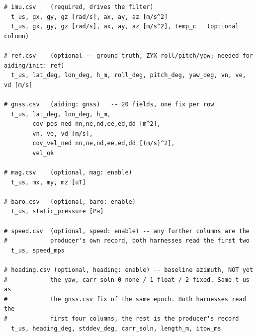 \documentclass[11pt,a4paper]{article}
\begin{document}
\begin{lstlisting}[basicstyle=\ttfamily\footnotesize,columns=fixed,keepspaces=true]
# imu.csv    (required, drives the filter)
  t_us, gx, gy, gz [rad/s], ax, ay, az [m/s^2]
  t_us, gx, gy, gz [rad/s], ax, ay, az [m/s^2], temp_c   (optional column)

# ref.csv    (optional -- ground truth, ZYX roll/pitch/yaw; needed for aiding/init: ref)
  t_us, lat_deg, lon_deg, h_m, roll_deg, pitch_deg, yaw_deg, vn, ve, vd [m/s]

# gnss.csv   (aiding: gnss)   -- 20 fields, one fix per row
  t_us, lat_deg, lon_deg, h_m,
        cov_pos_ned nn,ne,nd,ee,ed,dd [m^2],
        vn, ve, vd [m/s],
        cov_vel_ned nn,ne,nd,ee,ed,dd [(m/s)^2],
        vel_ok

# mag.csv    (optional, mag: enable)
  t_us, mx, my, mz [uT]

# baro.csv   (optional, baro: enable)
  t_us, static_pressure [Pa]

# speed.csv  (optional, speed: enable) -- any further columns are the
#            producer's own record, both harnesses read the first two
  t_us, speed_mps

# heading.csv (optional, heading: enable) -- baseline azimuth, NOT yet
#            the yaw, carr_soln 0 none / 1 float / 2 fixed. Same t_us as
#            the gnss.csv fix of the same epoch. Both harnesses read the
#            first four columns, the rest is the producer's record
  t_us, heading_deg, stddev_deg, carr_soln, length_m, itow_ms
\end{lstlisting}
\end{document}
